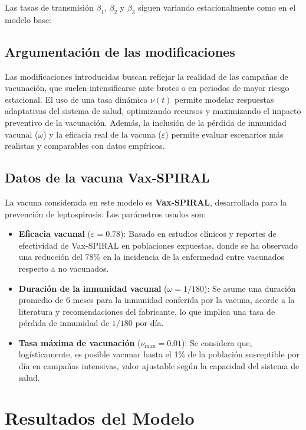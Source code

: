 \documentclass[12pt,a4paper]{article}
\begin{document}
Las tasas de transmisión $\beta_1$, $\beta_2$ y $\beta_3$ siguen variando estacionalmente como en el modelo base:


\subsection{Argumentación de las modificaciones}

Las modificaciones introducidas buscan reflejar la realidad de las campañas de vacunación, que suelen intensificarse ante brotes o en periodos de mayor riesgo estacional. El uso de una tasa dinámica $\nu(t)$ permite modelar respuestas adaptativas del sistema de salud, optimizando recursos y maximizando el impacto preventivo de la vacunación. Además, la inclusión de la pérdida de inmunidad vacunal ($\omega$) y la eficacia real de la vacuna ($\varepsilon$) permite evaluar escenarios más realistas y comparables con datos empíricos.

\subsection{Datos de la vacuna Vax-SPIRAL}

La vacuna considerada en este modelo es \textbf{Vax-SPIRAL}, desarrollada para la prevención de leptospirosis. Los parámetros usados son:

\begin{itemize}
    \item \textbf{Eficacia vacunal} ($\varepsilon = 0.78$): Basado en estudios clínicos y reportes de efectividad de Vax-SPIRAL en poblaciones expuestas, donde se ha observado una reducción del 78\% en la incidencia de la enfermedad entre vacunados respecto a no vacunados.
    \item \textbf{Duración de la inmunidad vacunal} ($\omega = 1/180$): Se asume una duración promedio de 6 meses para la inmunidad conferida por la vacuna, acorde a la literatura y recomendaciones del fabricante, lo que implica una tasa de pérdida de inmunidad de $1/180$ por día.
    \item \textbf{Tasa máxima de vacunación} ($\nu_{\max} = 0.01$): Se considera que, logísticamente, es posible vacunar hasta el 1\% de la población susceptible por día en campañas intensivas, valor ajustable según la capacidad del sistema de salud.
\end{itemize}

\newpage

\section{Resultados del Modelo}
\end{document}
